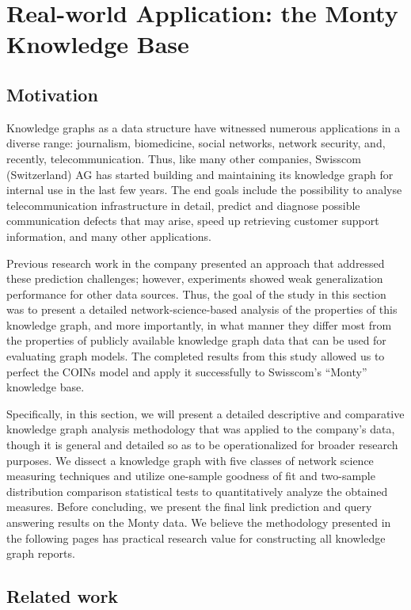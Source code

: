 \section{Real-world Application: the Monty Knowledge Base}
\label{sec: swisscom}

\subsection{Motivation}

Knowledge graphs as a data structure have witnessed numerous applications in a diverse range: journalism, biomedicine, social networks, network security, and, recently, telecommunication. Thus, like many other companies, Swisscom (Switzerland) AG has started building and maintaining its knowledge graph for internal use in the last few years. The end goals include the possibility to analyse telecommunication infrastructure in detail, predict and diagnose possible communication defects that may arise, speed up retrieving customer support information, and many other applications.

Previous research work in the company presented an approach that addressed these prediction challenges; however, experiments showed weak generalization performance for other data sources. Thus, the goal of the study in this section was to present a detailed network-science-based analysis of the properties of this knowledge graph, and more importantly, in what manner they differ most from the properties of publicly available knowledge graph data that can be used for evaluating graph models. The completed results from this study allowed us to perfect the COINs model and apply it successfully to Swisscom's \enquote{Monty} knowledge base. 

Specifically, in this section, we will present a detailed descriptive and comparative knowledge graph analysis methodology that was applied to the company's data, though it is general and detailed so as to be operationalized for broader research purposes. We dissect a knowledge graph with five classes of network science measuring techniques and utilize one-sample goodness of fit and two-sample distribution comparison statistical tests to quantitatively analyze the obtained measures. Before concluding, we present the final link prediction and query answering results on the Monty data. We believe the methodology presented in the following pages has practical research value for constructing all knowledge graph reports. 

\subsection{Related work}
\label{sec:related_work}

